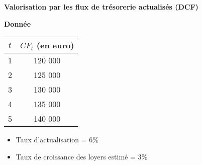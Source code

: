 \documentclass{beamer}
\begin{document}
\begin{frame}{\textbf{Valorisation par les flux de trésorerie actualisés (DCF)}}
	\begin{exampleblock}{\textbf{Donnée}}
		\begin{center}
			\begin{tabular}{@{}cc@{}}
				\toprule
				\( t \) & \( CF_t\) (en euro)\\ \midrule
				1   & 120 000                   \\
				2   & 125 000                   \\
				3   & 130 000                   \\
				4   & 135 000                   \\
				5   & 140 000                   \\ \bottomrule
			\end{tabular}
		\end{center}

\begin{itemize}
	\item Taux d'actualisation = 6\%
	\item Taux de croissance des loyers estimé = 3\%
\end{itemize}
		
		
		
	\end{exampleblock}
\end{frame}
\end{document}

